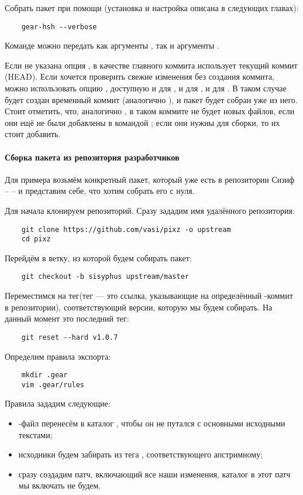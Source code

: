 Собрать пакет при помощи  (установка и настройка  описана в следующих главах): 
\begin{verbatim}
	gear-hsh --verbose
\end{verbatim}

Команде  можно передать как аргументы , так и аргументы .

Если не указана опция ,  в качестве главного коммита использует текущий 
коммит (HEAD). Если хочется проверить свежие изменения без создания коммита, можно использовать опцию 
, доступную и для , и для , и для . В таком случае 
будет создан временный коммит (аналогично ), и пакет будет собран уже из него. 
Стоит отметить, что, аналогично , в таком коммите не будет новых файлов, если они 
ещё не были добавлены в  командой ; если они нужны для сборки, то их стоит добавить. 

\paragraph{Сборка пакета из репозитория разработчиков}
Для примера возьмём конкретный пакет, который уже есть в репозитории Сизиф --  -- и представим 
себе, что хотим собрать его с нуля.

Для начала клонируем репозиторий. Сразу зададим имя удалённого репозитория: 
\begin{verbatim}
	git clone https://github.com/vasi/pixz -o upstream
	cd pixz
\end{verbatim}

Перейдём в ветку, из которой будем собирать пакет: 
\begin{verbatim}
	git checkout -b sisyphus upstream/master
\end{verbatim}

Переместимся на тег(тег --- это ссылка, указывающие на определённый -коммит в репозитории), 
соответствующий версии, которую мы будем собирать. На данный момент это последний тег: 
\begin{verbatim}
	git reset --hard v1.0.7
\end{verbatim}

Определим правила экспорта: 
\begin{verbatim}
	mkdir .gear
	vim .gear/rules
\end{verbatim}

Правила зададим следующие: 
\begin{itemize}
	\item {}-файл перенесём в каталог , чтобы он не путался с основными исходными текстами;
	\item исходники будем забирать из тега , соответствующего апстримному;
	\item сразу создадим патч, включающий все наши изменения, каталог  в этот патч мы включать не будем.
\end{itemize}

